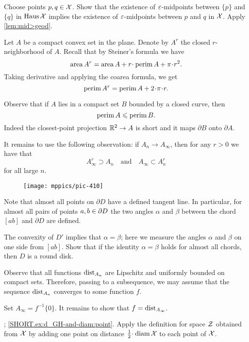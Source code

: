 Choose points $p,q\in\mathcal{X}$. 
Show that the existence of $\varepsilon$-midpoints between $\{p\}$ and $\{q\}$ in $\operatorname{\rm Haus}\nolimits\mathcal{X}$ implies the existence of $\varepsilon$-midpoints between $p$ and $q$ in $\mathcal{X}$.
Apply \ref{lem:mid>geod}.


Let $A$ be a compact convex set in the plane.
Denote by $A^r$ the closed $r$-neighborhood of $A$.
Recall that by Steiner's formula we have
\[\area A^r=\area A+r\cdot\perim A+\pi\cdot r^2.\]
Taking derivative and applying the coarea formula, we get 
\[\perim A^r=\perim A+2\cdot\pi\cdot r.\]

Observe that if $A$ lies in a compact set $B$ bounded by a closed curve, then 
\[\operatorname{\rm perim}\nolimits A\leqslant \operatorname{\rm perim}\nolimits B.\]
Indeed the closest-point projection $\mathbb{R}^2\to A$ is short and it maps $\partial B$ onto $\partial A$.

It remains to use the following observation: if $A_n\to A_\infty$, then for any $r>0$ we have that
\[A_\infty^r\supset A_n
\quad\text{and}\quad
A_\infty\subset A_n^r\]
for all large $n$.

\begin{wrapfigure}{r}{27 mm}
\vskip-0mm
\centering
\texttt{[image: mppics/pic-410]}
\end{wrapfigure}

Note that almost all points on $\partial D$ have a defined tangent line.
In particular, for almost all pairs of points $a,b\z\in\partial D$ the two angles $\alpha$ and $\beta$ between the chord $[ab]$ and $ \partial D$ are defined.

The convexity of $D'$ implies that $\alpha=\beta$;
here we measure the angles $\alpha$ and $\beta$ on one side from $[ab]$.
Show that if the identity $\alpha=\beta$ holds for almost all chords, then $D$ is a round disk. 


Observe that all functions $\mathrm{dist}_{A_n}$ are Lipschitz and uniformly bounded on compact sets.
Therefore, passing to a subsequence, we may assume that the sequence $\mathrm{dist}_{A_n}$ converges to some function $f$.

Set $A_\infty=f^{-1}\{0\}$.
It remains to show that $f=\mathrm{dist}_{A_\infty}$.


\parbf{\ref{ex:d_GH-and-diam}};
\ref{SHORT.ex:d_GH-and-diam:point}.
Apply the definition for space $\mathcal{Z}$ obtained from $\mathcal{X}$ by adding one point on distance $\tfrac12\cdot\diam \spc{X}$ to each point of $\mathcal{X}$.

